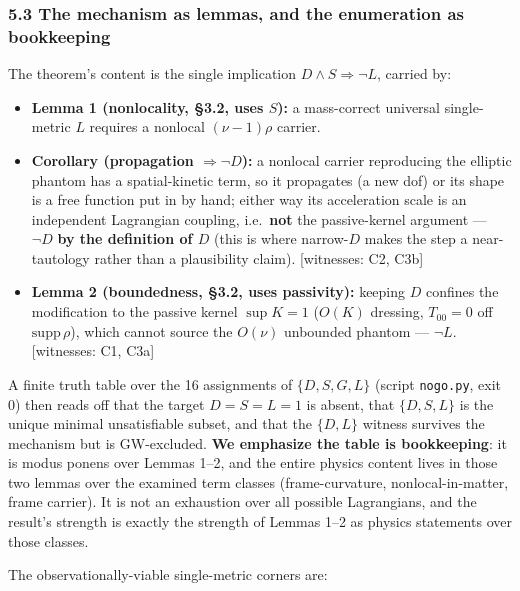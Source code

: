 \documentclass[
]{article}
\providecommand{\tightlist}{%
  \setlength{\itemsep}{0pt}\setlength{\parskip}{0pt}}
\begin{document}
\subsubsection{5.3 The mechanism as lemmas, and the enumeration as
bookkeeping}\label{the-mechanism-as-lemmas-and-the-enumeration-as-bookkeeping}

The theorem's content is the single implication
\(D\wedge S\Rightarrow\lnot L\), carried by:

\begin{itemize}
\tightlist
\item
  \textbf{Lemma 1 (nonlocality, §3.2, uses \(S\)):} a mass-correct
  universal single-metric \(L\) requires a nonlocal \((\nu-1)\rho\)
  carrier.
\item
  \textbf{Corollary (propagation \(\Rightarrow\lnot D\)):} a nonlocal
  carrier reproducing the elliptic phantom has a spatial-kinetic term,
  so it propagates (a new dof) or its shape is a free function put in by
  hand; either way its acceleration scale is an independent Lagrangian
  coupling, i.e.~\textbf{not} the passive-kernel argument ---
  \(\lnot D\) \textbf{by the definition of \(D\)} (this is where
  narrow-\(D\) makes the step a near-tautology rather than a
  plausibility claim). {[}witnesses: C2, C3b{]}
\item
  \textbf{Lemma 2 (boundedness, §3.2, uses passivity):} keeping \(D\)
  confines the modification to the passive kernel \(\sup K=1\) (\(O(K)\)
  dressing, \(T_{00}=0\) off \(\mathrm{supp}\,\rho\)), which cannot
  source the \(O(\nu)\) unbounded phantom --- \(\lnot L\). {[}witnesses:
  C1, C3a{]}
\end{itemize}

A finite truth table over the 16 assignments of \(\{D,S,G,L\}\) (script
\texttt{nogo.py}, exit 0) then reads off that the target \(D=S=L=1\) is
absent, that \(\{D,S,L\}\) is the unique minimal unsatisfiable subset,
and that the \(\{D,L\}\) witness survives the mechanism but is
GW-excluded. \textbf{We emphasize the table is bookkeeping}: it is modus
ponens over Lemmas 1--2, and the entire physics content lives in those
two lemmas over the examined term classes (frame-curvature,
nonlocal-in-matter, frame carrier). It is not an exhaustion over all
possible Lagrangians, and the result's strength is exactly the strength
of Lemmas 1--2 as physics statements over those classes.

The observationally-viable single-metric corners are:
\end{document}
